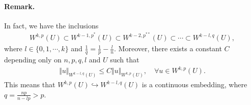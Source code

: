 \documentclass{article}
\numberwithin{equation}{section}
\theoremstyle{plain}
\theoremstyle{definition}
\begin{document}
\paragraph{Remark.} In fact, we have the inclusions
\begin{align*}
	W^{k,p}(U)\subset W^{k-1,p^*}(U)\subset W^{k-2,p^{**}}(U)\subset\cdots\subset W^{k-l,q}(U),
\end{align*}
where $l\in\{0,1,\cdots,k\}$ and $\frac{1}{q}=\frac{1}{p}-\frac{l}{n}$. Moreover, there exists a constant $C$ depending only on $n,p,q,l$ and $U$ such that
\begin{align*}
	\Vert u\Vert_{W^{k-l,q}(U)}\leq C\Vert u\Vert_{W^{k,p}(U)},\quad\forall u\in W^{k,p}(U).
\end{align*}
This means that $W^{k,p}(U)\hookrightarrow W^{k-l,q}(U)$ is a continuous embedding, where $q=\frac{np}{n-lp}>p$.
\end{document}
